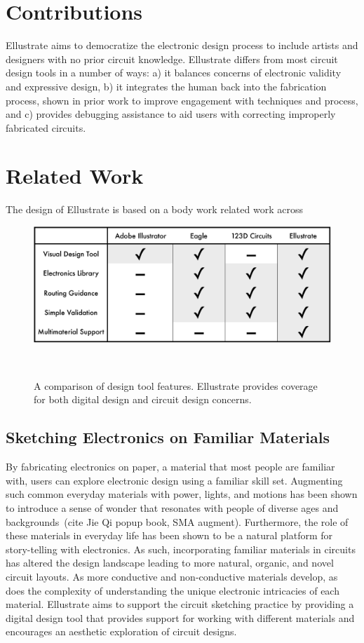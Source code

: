 \documentclass{sigchi}
\begin{document}
\section{Contributions}
Ellustrate aims to democratize the electronic design process to include artists and designers with no prior circuit knowledge. 
Ellustrate differs from most circuit design tools in a number of ways: a) it balances concerns of electronic validity and expressive design, b) it integrates the human back into the fabrication process, shown in prior work to improve engagement with techniques and process, and c) provides debugging assistance to aid users with correcting improperly fabricated circuits.


\section{Related Work}
The design of Ellustrate is based on a body work related work across 


\begin{figure}[t]
\centering
  \includegraphics[width=1\columnwidth]{figures/comparative_table.pdf}
  \caption{A comparison of design tool features. Ellustrate provides coverage for both digital design and circuit design concerns. }~\label{fig:comparison_table}
  \vspace{-16pt}
\end{figure}

\subsection{Sketching Electronics on Familiar Materials}
By fabricating electronics on paper, a material that most people are familiar with, users can explore electronic design using a familiar skill set.  Augmenting such common everyday materials with power, lights, and motions has been shown to introduce a sense of wonder that resonates with people of diverse ages and backgrounds~\cite{karagozler_paper_2013}(cite Jie Qi popup book, SMA augment). Furthermore, the role of these materials in everyday life has been shown to be a natural platform for story-telling with electronics. As such, incorporating familiar materials in circuits has altered the design landscape leading to more natural, organic, and novel circuit layouts.
As more conductive and non-conductive materials develop, as does the complexity of understanding the unique electronic intricacies of each material.  Ellustrate aims to support the circuit sketching practice by providing a digital design tool that provides support for working with different materials and encourages an aesthetic exploration of circuit designs.
\end{document}
